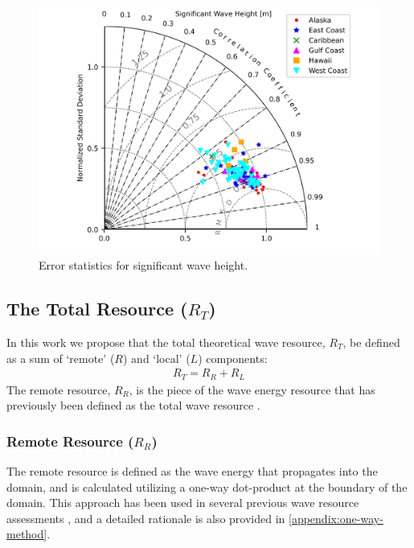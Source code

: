 \begin{figure}[ht]
  \centering
  \includegraphics[width=140mm]{./fig/taylorBasicHs.png}
  \caption{Error statistics for significant wave height.}
  \label{fig:validationHs}
\end{figure}

\subsection{The Total Resource ($R_T$) \label{sec:method:calc}}

In this work we propose that the total theoretical wave resource, $R_T$, be defined as a sum of `remote' ($R$) and `local' ($L$) components:
\begin{align}
  R_T = R_R + R_L
\end{align}
The remote resource, $R_R$, is the piece of the wave energy resource that has previously been defined as the total wave resource \citep{gunnQuantifyingGlobalWave2012,EPRIwaveresource2011}.

\subsubsection{Remote Resource ($R_{R}$)} \label{sec:method:calc:remote}

The remote resource is defined as the wave energy that propagates into the domain, and is calculated utilizing a one-way dot-product at the boundary of the domain. This approach has been used in several previous wave resource assessments \citep{gunnQuantifyingGlobalWave2012, hemerRevisedAssessmentAustralia2017, regueroGlobalWavePower2015, garcia-medinaWaveResourceAssessment2014}, and a detailed rationale is also provided in \ref{appendix:one-way-method}. 

